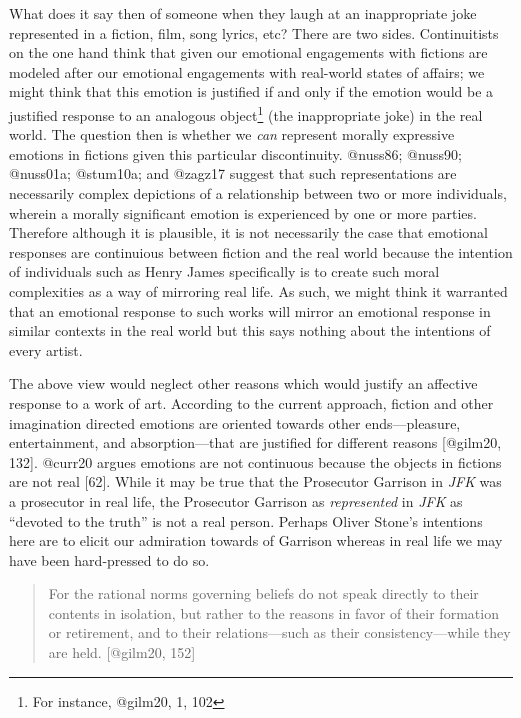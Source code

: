 \documentclass[
  letterpaper,
  DIV=11,
  numbers=noendperiod]{scrartcl}
\theoremstyle{remark}
\begin{document}
What does it say then of someone when they laugh at an inappropriate
joke represented in a fiction, film, song lyrics, etc? There are two
sides. Continuitists on the one hand think that given our emotional
engagements with fictions are modeled after our emotional engagements
with real-world states of affairs; we might think that this emotion is
justified if and only if the emotion would be a justified response to an
analogous object\footnote{For instance, @gilm20, 1, 102} (the
inappropriate joke) in the real world. The question then is whether we
\emph{can} represent morally expressive emotions in fictions given this
particular discontinuity. @nuss86; @nuss90; @nuss01a; @stum10a; and
@zagz17 suggest that such representations are necessarily complex
depictions of a relationship between two or more individuals, wherein a
morally significant emotion is experienced by one or more parties.
Therefore although it is plausible, it is not necessarily the case that
emotional responses are continuious between fiction and the real world
because the intention of individuals such as Henry James specifically is
to create such moral complexities as a way of mirroring real life. As
such, we might think it warranted that an emotional response to such
works will mirror an emotional response in similar contexts in the real
world but this says nothing about the intentions of every artist.

The above view would neglect other reasons which would justify an
affective response to a work of art. According to the current approach,
fiction and other imagination directed emotions are oriented towards
other ends---pleasure, entertainment, and absorption---that are
justified for different reasons {[}@gilm20, 132{]}. @curr20 argues
emotions are not continuous because the objects in fictions are not real
{[}62{]}. While it may be true that the Prosecutor Garrison in
\emph{JFK} was a prosecutor in real life, the Prosecutor Garrison as
\emph{represented} in \emph{JFK} as ``devoted to the truth'' is not a
real person. Perhaps Oliver Stone's intentions here are to elicit our
admiration towards of Garrison whereas in real life we may have been
hard-pressed to do so.

\begin{quote}
For the rational norms governing beliefs do not speak directly to their
contents in isolation, but rather to the reasons in favor of their
formation or retirement, and to their relations---such as their
consistency---while they are held. {[}@gilm20, 152{]}
\end{quote}
\end{document}
